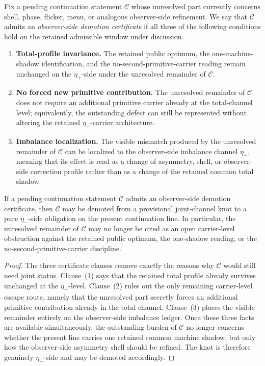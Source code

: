 \begin{definition}
Fix a pending continuation statement \(\mathcal C\) whose unresolved part currently concerns shell, phase, flicker, menu, or analogous observer-side refinement. We say that \(\mathcal C\) admits an \emph{observer-side demotion certificate} if all three of the following conditions hold on the retained admissible window under discussion.
\begin{enumerate}[leftmargin=2em]
 \item \textbf{Total-profile invariance.} The retained public optimum, the one-machine-shadow identification, and the no-second-primitive-carrier reading remain unchanged on the \(\eta_+\)-side under the unresolved remainder of \(\mathcal C\).
 \item \textbf{No forced new primitive contribution.} The unresolved remainder of \(\mathcal C\) does not require an additional primitive carrier already at the total-channel level; equivalently, the outstanding defect can still be represented without altering the retained \(\eta_+\)-carrier architecture.
 \item \textbf{Imbalance localization.} The visible mismatch produced by the unresolved remainder of \(\mathcal C\) can be localized to the observer-side imbalance channel \(\eta_-\), meaning that its effect is read as a change of asymmetry, shell, or observer-side correction profile rather than as a change of the retained common total shadow.
\end{enumerate}
\end{definition}

\begin{proposition}
If a pending continuation statement \(\mathcal C\) admits an observer-side demotion certificate, then \(\mathcal C\) may be demoted from a provisional joint-channel knot to a pure \(\eta_-\)-side obligation on the present continuation line. In particular, the unresolved remainder of \(\mathcal C\) may no longer be cited as an open carrier-level obstruction against the retained public optimum, the one-shadow reading, or the no-second-primitive-carrier discipline.
\end{proposition}

\begin{proof}
The three certificate clauses remove exactly the reasons why \(\mathcal C\) would still need joint status. Clause~(1) says that the retained total profile already survives unchanged at the \(\eta_+\)-level. Clause~(2) rules out the only remaining carrier-level escape route, namely that the unresolved part secretly forces an additional primitive contribution already in the total channel. Clause~(3) places the visible remainder entirely on the observer-side imbalance ledger. Once these three facts are available simultaneously, the outstanding burden of \(\mathcal C\) no longer concerns whether the present line carries one retained common machine shadow, but only how the observer-side asymmetry shell should be refined. The knot is therefore genuinely \(\eta_-\)-side and may be demoted accordingly.
\end{proof}

